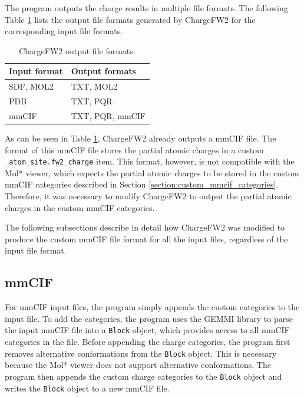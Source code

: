 \documentclass[
  digital,     %
  oneside,     %
  nosansbold,  %
  nocolorbold, %
  lof,         %
  lot,         %
]{fithesis4}
\begin{document}
The program outputs the charge results in multiple file formats. The following Table \ref{table:chargefw2_output_formats} lists the output file formats generated by ChargeFW2 for the corresponding input file formats.

\begin{table}[htbp]
  \centering
  \begin{tabular}{|l|l|}
    \hline
    \textbf{Input format} & \textbf{Output formats} \\
    \hline
    SDF, MOL2 & TXT, MOL2 \\
    \hline
    PDB & TXT, PQR \\
    \hline
    mmCIF & TXT, PQR, mmCIF \\
    \hline
  \end{tabular}
  \caption{ChargeFW2 output file formats.}
  \label{table:chargefw2_output_formats}
\end{table}

As can be seen in Table \ref{table:chargefw2_output_formats}, ChargeFW2 already outputs a mmCIF file. The format of this mmCIF file stores the partial atomic charges in a custom \texttt{\_atom\_site.fw2\_charge} item. This format, however, is not compatible with the Mol* viewer, which expects the partial atomic charges to be stored in the custom mmCIF categories described in Section \ref{section:custom_mmcif_categories}. Therefore, it was necessary to modify ChargeFW2 to output the partial atomic charges in the custom mmCIF categories.

The following subsections describe in detail how ChargeFW2 was modified to produce the custom mmCIF file format for all the input files, regardless of the input file format.

\subsection{mmCIF}

For mmCIF input files, the program simply appends the custom categories to the input file. To add the categories, the program uses the GEMMI library \cite{wojdyr2022gemmi} to parse the input mmCIF file into a \texttt{Block} object, which provides access to all mmCIF categories in the file. Before appending the charge categories, the program first removes alternative conformations from the \texttt{Block} object. This is necessary because the Mol* viewer does not support alternative conformations. The program then appends the custom charge categories to the \texttt{Block} object and writes the \texttt{Block} object to a new mmCIF file.
\end{document}
